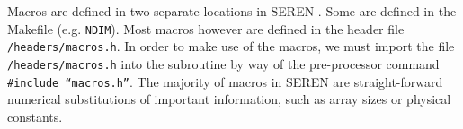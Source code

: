 \documentclass[a4paper]{article}
\newcommand{\NAME}{SEREN }
\newcommand{\var}[1]{\texttt{#1}}
\begin{document}
Macros are defined in two separate locations in \NAME.  Some are defined in the Makefile (e.g. \var{NDIM}). Most macros however are defined in the header file \var{/headers/macros.h}.  In order to make use of the macros, we must import the file \var{/headers/macros.h} into the subroutine by way of the pre-processor command \var{\#include ``macros.h''}.  The majority of macros in \NAME are straight-forward numerical substitutions of important information, such as array sizes or physical constants.

\end{document}
